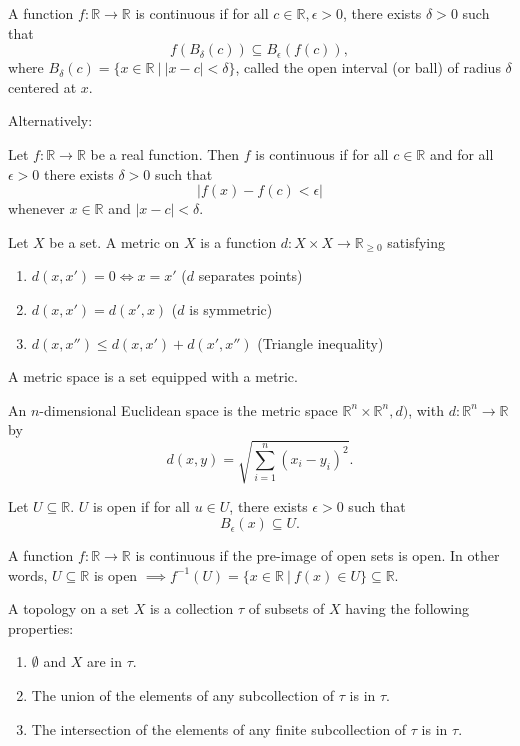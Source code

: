 \documentclass{article}
\newcommand{\inv}{^{-1}}
\newcommand{\R}{\mathbb R}
\begin{document}
\pagecolor{black}
\color{white}


    A function $f: \R \to \R$ is continuous if for all $c \in \R, \epsilon > 0$, there exists $\delta>0$ such that $$f(B_\delta(c)) \subseteq B_\epsilon(f(c)),$$
    where $B_\delta(c)=\{x \in \R~|~|x-c|<\delta\}$, called the open interval (or ball) of radius $\delta$ centered at $x$.

    Alternatively:

    Let $f: \R \to \R$ be a real function. Then $f$ is continuous if for all $c \in \R$ and for all $\epsilon > 0$ there exists $\delta>0$ such that $$|f(x)-f(c)<\epsilon|$$ whenever $x \in \R$ and $|x-c|<\delta$.

\medskip{}

	Let $X$ be a set. A metric on $X$ is a function $d: X \times X \to \R_{\geq 0}$ satisfying
	\begin{enumerate}
		\item $d(x,x')=0 \iff x=x'$ ($d$ separates points)
		\item $d(x,x') = d(x',x)$ ($d$ is symmetric)
		\item $d(x,x'') \leq d(x,x') + d(x', x'')$ (Triangle inequality)
	\end{enumerate}

\medskip{}
	
	A metric space is a set equipped with a metric.

\medskip{}

	An $n$-dimensional Euclidean space is the metric space $\R^n \times \R^n, d)$, with $d: \R^n \to \R$ by $$d(x, y) = \sqrt{\sum_{i=1}^n (x_i-y_i)^2}.$$

\medskip{}

	Let $U \subseteq \R$. $U$ is open if for all $u \in U$, there exists $\epsilon > 0$ such that $$B_\epsilon(x) \subseteq U.$$

\medskip{}

	A function $f: \R \to \R$ is continuous if the pre-image of open sets is open. In other words, $U \subseteq \R$ is open $\implies f\inv(U) = \{x \in \R~|~f(x) \in U\} \subseteq \R$.

\medskip{}

	A topology on a set $X$ is a collection $\tau$ of subsets of $X$ having the following properties:

    \begin{enumerate}
        \item $\emptyset$ and $X$ are in $\tau$.
        \item The union of the elements of any subcollection of $\tau$ is in $\tau$.
        \item The intersection of the elements of any finite subcollection of $\tau$ is in $\tau$.
    \end{enumerate}
\end{document}

